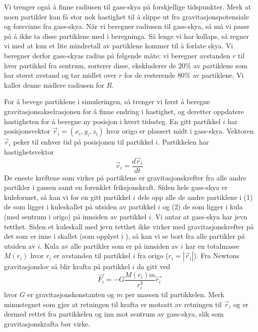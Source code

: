 \documentclass[reprint,english,notitlepage]{revtex4-1}  %
\begin{document}
Vi trenger også å finne radiusen til gass-skya på forskjellige tidspunkter. Merk at noen partikler kan få stor nok hastighet til å slippe ut fra gravitasjonspotensiale og forsvinne fra gass-skya. Når vi beregner radiusen til gass-skya, så må vi passe på å ikke ta disse partiklene med i beregninga. Så lenge vi har kollaps, så regner vi med at kun et lite mindretall av partiklene kommer til å forlate skya. Vi beregner derfor gass-skyas radius på følgende måte: vi beregner avstanden $r$ til hver partikkel fra sentrum, sorterer disse, ekskluderer de $20\%$ av partiklene som har størst avstand og tar midlet over $r$ for de resterende $80\%$ av partiklene. Vi kaller denne midlere radiusen for $R$.

For å bevege partiklene i simuleringen, så trenger vi først å beregne gravitasjonsakselrasjonen for å finne endring i hastighet, og deretter oppdatere hastigheten for å beregne ny posisjon i hvert tidssteg. En gitt partikkel $i$ har posisjonsvektor $\vec{r}_i=(x_i,y_i,z_i)$ hvor origo er plassert midt i gass-skya. Vektoren $\vec{r}_i$ peker til enhver tid på posisjonen til partikkel $i$. Partikkelen har hastighetsvektor
\begin{equation}
\label{eq:vel}
\vec{v}_i=\frac{d\vec{r}_i}{dt}
\end{equation}
De eneste kreftene som virker på partiklene er gravitasjonskrefter fra alle andre partikler i gassen samt en forenklet friksjonskraft. Siden hele gass-skya er kuleformet, så kan vi for en gitt partikkel $i$ dele opp alle de andre partiklene i (1) de som ligger i kuleskallet på utsiden av partikkel $i$ og (2) de som ligger i kula (med sentrum i origo) på innsiden av partikkel $i$. Vi antar at gass-skya har jevn tetthet. Siden et kuleskall med jevn tetthet ikke virker med gravitasjonskrefter på det som er inne i skallet (som opplyst i \citep{part1A}), så kan vi se bort fra alle partikler på utsiden av $i$. Kula av alle partikler som er på innsiden av $i$ har en totalmasse $M(r_i)$ hvor $r_i$ er avstanden til partikkel $i$ fra origo ($r_i=|\vec{r}_i|$). Fra Newtons gravitasjonslov så blir krafta på partikkel $i$ da gitt ved
\begin{equation}
\label{eq:grav}
\vec{F_i}=-G\frac{M(r_i)m}{r_i^3}\vec{r_i}
\end{equation}
hvor $G$ er gravitasjonskonstanten og $m$ per massen til partikkelen. Merk minustegnet som gjør at retningen til krafta er motsatt av retningen til $\vec{r}_i$ og er dermed rettet fra partikkelen og inn mot sentrum av gass-skya, slik som gravitasjonskrafta bør virke.
\end{document}
